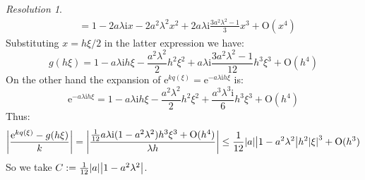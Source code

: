 \documentclass[10pt,a4paper]{article}
\newcommand{\ii}{\mathrm{i}} %
\renewcommand{\O}{\mathrm{O}} %
\theoremstyle{definition}
\theoremstyle{remark}
\newtheorem*{res}{Resolution}
\renewcommand{\exp}[1]{\mathrm{e}^{#1}} %
\begin{document}
\begin{res}
\begin{align*}
                                                        & = 1 -2a\lambda \ii x -2a^2\lambda^2x^2 + 2a\lambda\ii\frac{3a^2\lambda^2-1}{3}x^3 +\O(x^4)
  \end{align*}
  Substituting $x=h\xi/2$ in the latter expression we have:
  $$
    g(h\xi) =  1 -a\lambda \ii h\xi -\frac{a^2\lambda^2}{2}h^2\xi^2 + a\lambda\ii\frac{3a^2\lambda^2-1}{12}h^3\xi^3 +\O(h^4)
  $$
  On the other hand the expansion of $\exp{kq(\xi)}=\exp{-a\lambda\ii h\xi}$ is:
  $$
    \exp{-a\lambda\ii h\xi}=1-a\lambda\ii h\xi-\frac{a^2\lambda^2}{2}h^2\xi^2+\frac{a^3\lambda^3\ii}{6} h^3\xi^3+\O(h^4)
  $$
  Thus:
  $$
    \abs{\frac{\exp{kq(\xi)}-g(h\xi)}{k}}=\abs{\frac{\frac{1}{12}a\lambda \ii (1-a^2\lambda^2)h^3\xi^3 + \O(h^4)}{\lambda h}}\leq  \frac{1}{12}\abs{a} \abs{1-a^2\lambda^2}h^2\abs{\xi}^3 +\O(h^3)
  $$
  So we take $C:=\frac{1}{12}\abs{a} \abs{1-a^2\lambda^2}$.

\end{res}
\end{document}

